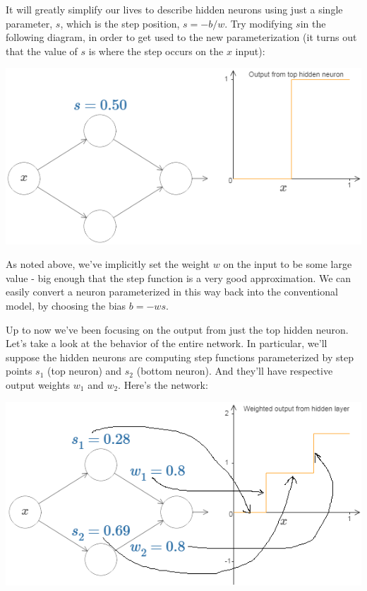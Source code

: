 It will greatly simplify our lives to describe hidden neurons using just a single parameter, $s$, which is the step position, $s=-b/w$. Try modifying $s$in the following diagram, in order to get used to the new parameterization (it turns out that the value of $s$ is where the step occurs on the $x$ input):


{\centering \includegraphics[width=\textwidth,]{pic/wigglyfn10.png} \par}

As noted above, we've implicitly set the weight $w$ on the input to be some large value - big enough that the step function is a very good approximation. We can easily convert a neuron parameterized in this way back into the conventional model, by choosing the bias $b=-ws$.


Up to now we've been focusing on the output from just the top hidden neuron. Let's take a look at the behavior of the entire network. In particular, we'll suppose the hidden neurons are computing step functions parameterized by step points $s_1$ (top neuron) and $s_2$ (bottom neuron). And they'll have respective output weights $w_1$ and $w_2$. Here's the network:

{\centering \includegraphics[width=\textwidth,]{pic/wigglyfn11.png} \par}

